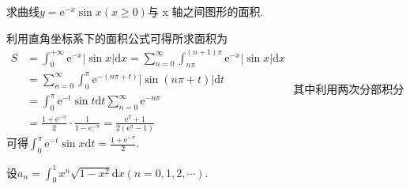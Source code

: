 \documentclass[kindlepaper]{BHCexam4kindle}
\begin{document}
\begin{questions}
\begin{solution}
		\end{solution}

		\qs 求曲线$y=\mathrm{e}^{-x} \sin x(x \geqslant 0)$与 x 轴之间图形的面积.
		\begin{solution}
			利用直角坐标系下的面积公式可得所求面积为\\
		$\begin{aligned} S &=\int_{0}^{+\infty} \mathrm{e}^{-x}|\sin x| \mathrm{d} x=\sum_{n=0}^{\infty} \int_{n \pi}^{(n+1) \pi} \mathrm{e}^{-x}|\sin x| \mathrm{d} x \\ &=\sum_{n=0}^{\infty} \int_{0}^{\pi} \mathrm{e}^{-(n \pi+t)}|\sin (n \pi+t)| \mathrm{d} t \\ &=\int_{0}^{\pi} \mathrm{e}^{-t} \sin t \mathrm{d} t \sum_{n=0}^{\infty} \mathrm{e}^{-n \pi} \\ &=\frac{1+\mathrm{e}^{-\pi}}{2} \cdot \frac{1}{1-\mathrm{e}^{-\pi}}=\frac{\mathrm{e}^{\pi}+1}{2\left(\mathrm{e}^{\pi}-1\right)} \end{aligned}$
			其中利用两次分部积分可得$\int_{0}^{\pi} \mathrm{e}^{-t} \sin x \mathrm{d} t=\frac{1+\mathrm{e}^{-\pi}}{2}$.
		\end{solution}

		\qs 设$a_{n}=\int_{0}^{1} x^{n} \sqrt{1-x^{2}} \mathrm{d} x(n=0,1,2, \cdots)$.
		\begin{parts}

\end{parts}
\end{questions}
\end{document}
